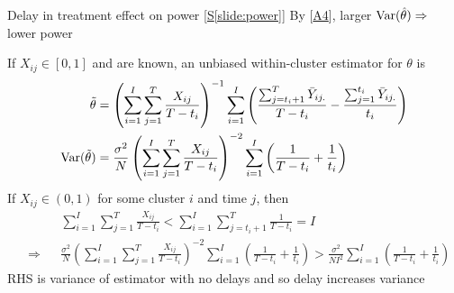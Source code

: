 \documentclass[9pt]{beamer}
\begin{document}
\addtocounter{framenumber}{-1}
\begin{frame}{Delay in treatment effect on power [\hyperlink{slide:power}{S\ref{slide:power}}]} \label{apx:delay}
By [\hyperlink{apx:power}{A4}], larger $\mathrm{Var}(\hat{\theta})\Rightarrow$ lower power
\vspace{2em}

If $X_{ij}\in[0,1]$ and are known, an unbiased within-cluster estimator for $\theta$ is
\begin{align*}
\tilde{\theta} &= \left(\sum_{i=1}^I\sum_{j=1}^T\frac{X_{ij}}{T-t_i}\right)^{-1}\sum_{i=1}^I\left(\frac{\sum_{j=t_i+1}^T\bar{Y}_{ij.}}{T-t_i} - \frac{\sum_{j=1}^{t_i}\bar{Y}_{ij.}}{t_i}\right) \\
\mathrm{Var}(\tilde{\theta}) &= \frac{\sigma^2}{N}\left(\sum_{i=1}^I\sum_{j=1}^T\frac{X_{ij}}{T-t_i}\right)^{-2}\sum_{i=1}^I\left(\frac{1}{T-t_i} + \frac{1}{t_i}\right)
\end{align*}
If $X_{ij}\in(0,1)$ for some cluster $i$ and time $j$, then
\begin{align*}
 && &\sum_{i=1}^I\sum_{j=1}^T\frac{X_{ij}}{T-t_i} < \sum_{i=1}^I\sum_{j=t_i+1}^T\frac{1}{T-t_i} = I \\
 &\Rightarrow & & \frac{\sigma^2}{N}\left(\sum_{i=1}^I\sum_{j=1}^T\frac{X_{ij}}{T-t_i}\right)^{-2}\sum_{i=1}^I\left(\frac{1}{T-t_i} + \frac{1}{t_i}\right) > \frac{\sigma^2}{NI^2}\sum_{i=1}^I\left(\frac{1}{T-t_i} + \frac{1}{t_i}\right)
\end{align*}
RHS is variance of estimator with no delays and so delay increases variance
\end{frame}
\end{document}
